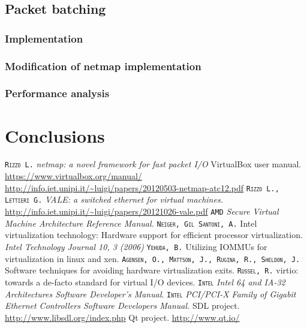 \documentclass[a4paper, 12pt, titlepage]{report}
\newcommand{\autori}[1]{\textsc{\texttt{#1}}}
\begin{document}
\section{Packet batching} \label{sec:packet_batching}
\subsection{Implementation}
\subsection{Modification of netmap implementation}
\subsection{Performance analysis}
\chapter{Conclusions}

\begin{thebibliography}{30}
 \autori{Rizzo L.} \textit{netmap: a novel framework for fast packet I/O}
 VirtualBox user manual. \url{https://www.virtualbox.org/manual/}
 \url{http://info.iet.unipi.it/~luigi/papers/20120503-netmap-atc12.pdf}
 \autori{Rizzo L., Lettieri G.} \textit{VALE: a switched ethernet for virtual machines.} \url{http://info.iet.unipi.it/~luigi/papers/20121026-vale.pdf}
 \autori{AMD} \textit{Secure Virtual Machine Architecture Reference Manual.}
 \autori{Neiger, Gil Santoni, A.} Intel virtualization technology: Hardware support for efficient processor virtualization. \textit{Intel Technology Journal 10, 3 (2006)}
 \autori{Yehuda, B.} Utilizing IOMMUs for virtualization in linux and xen.
 \autori{Agensen, O., Mattson, J., Rugina, R., Sheldon, J.} Software techniques for avoiding hardware virtualization exits.
 \autori{Russel, R.} virtio: towards a de-facto standard for virtual I/O devices.
 \autori{Intel} \textit{Intel 64 and IA-32 Architectures Software Developer's Manual}.
 \autori{Intel} \textit{PCI/PCI-X Family of Gigabit Ethernet Controllers Software Developers Manual.}
 SDL project. \url{http://www.libsdl.org/index.php}
 Qt project. \url{http://www.qt.io/}
\end{thebibliography}
	
\end{document}
